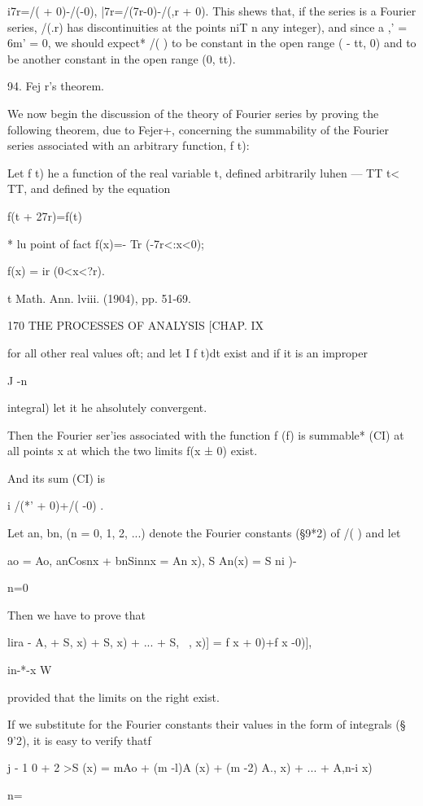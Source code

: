 i7r=/( + 0)-/(-0), |7r=/(7r-0)-/(,r + 0). This shews that, if the
series is a Fourier series, /(.r) has discontinuities at the points
niT n any integer), and since a ,' = 6m' = 0, we should expect* /( )
to be constant in the open range ( - tt, 0) and to be another constant
in the open range (0, tt).

94. Fej r's theorem.

We now begin the discussion of the theory of Fourier series by proving
the following theorem, due to Fejer+, concerning the summability of
the Fourier series associated with an arbitrary function, f t):

Let f t) he a function of the real variable t, defined arbitrarily
luhen — TT t< TT, and defined by the equation

f(t + 27r)=f(t)

* lu point of fact f(x)=- Tr (-7r<:x<0);

f(x) = ir (0<x<?r).

t Math. Ann. lviii. (1904), pp. 51-69.

170 THE PROCESSES OF ANALYSIS [CHAP. IX

for all other real values oft; and let I f t)dt exist and if it is an
improper

J -n

integral) let it he ahsolutely convergent.

Then the Fourier ser'ies associated with the function f (f) is
summable* (CI) at all points x at which the two limits f(x ± 0) exist.

And its sum (CI) is

i /(*' + 0)+/( -0) .

Let an, bn, (n = 0, 1, 2, ...) denote the Fourier constants (§9*2) of
/( ) and let

 ao = Ao, anCosnx + bnSinnx = An x), S An(x) = S ni )-

n=0

Then we have to prove that

lira - A, + S, x) + S, x) + ... + S, \ , x)] = f x + 0)+f x -0)],

in-*-x W

provided that the limits on the right exist.

If we substitute for the Fourier constants their values in the form of
integrals (§ 9'2), it is easy to verify thatf

j - 1 0 + 2 >S (x) = mAo + (m -l)A (x) + (m -2) A., x) + ... + A,n-i
x)

n=\


